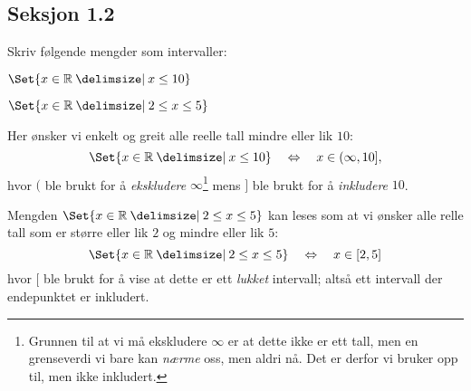 \documentclass[a4paper,11pt]{article}
\begin{document}
\newpageLF


\subsection*{Seksjon 1.2}


\begin{problem}[1]
  Skriv følgende mengder som intervaller:
  \begin{subproblem}{2}
    \item $\Set{x \in \R \given        x \leq 10}$
      \label{subproblem:1.2-1a-oving-01-2019-MAT-0001}
    \item $\Set{x \in \R \given 2 \leq x \leq  5}$
      \label{subproblem:1.2-1b-oving-01-2019-MAT-0001}
  \end{subproblem}
\end{problem}

\begin{solution}
  Her ønsker vi enkelt og greit alle reelle tall mindre eller lik $10$:
  \begin{equation*}
    \Set{x \in \R \given        x \leq 10}
    \quad \Leftrightarrow \quad
    x \in (\infty,10],
  \end{equation*}
  hvor $($ ble brukt for å \emph{ekskludere} $\infty$\footnote{Grunnen til at vi
  må ekskludere $\infty$ er at dette ikke er ett tall, men en grenseverdi vi
bare kan \emph{nærme} oss, men aldri nå.  Det er derfor vi bruker opp til, men
ikke inkludert.} mens $]$ ble brukt for å \emph{inkludere} $10$.
\end{solution}

\medskip

\begin{solution}
  Mengden $\Set{x \in \R \given 2 \leq x \leq  5}$ kan leses som at vi ønsker
  alle relle tall som er større eller lik $2$ og mindre eller lik $5$:
  \begin{equation*}
    \Set{x \in \R \given 2 \leq x \leq  5}
    \quad \Leftrightarrow \quad
    x \in [2,5]
  \end{equation*}
  hvor $[$ ble brukt for å vise at dette er ett \emph{lukket} intervall; 
  altså ett intervall der endepunktet er inkludert. 
\end{solution}
\end{document}
